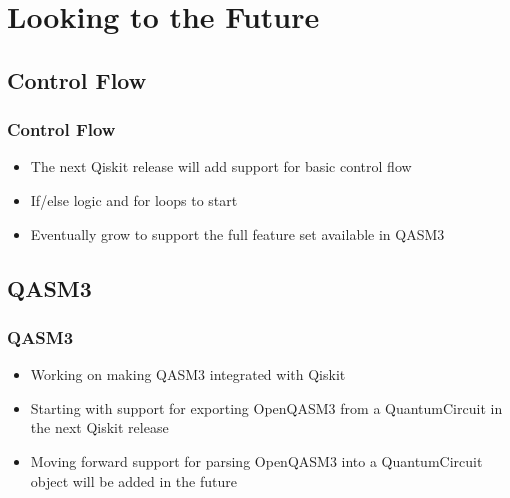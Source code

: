 \documentclass[aspectratio=169,11pt,hyperref={colorlinks=true}]{beamer}
\begin{document}
\section{Looking to the Future}
\subsection{Control Flow}
\begin{frame}
    \frametitle{Control Flow}
    \begin{itemize}
        \item The next Qiskit release will add support for basic control flow
        \item If/else logic and for loops to start
        \item Eventually grow to support the full feature set available in QASM3
    \end{itemize}
\end{frame}

\subsection{QASM3}
\begin{frame}
    \frametitle{QASM3}
    \begin{itemize}
        \item Working on making QASM3 integrated with Qiskit
        \item Starting with support for exporting OpenQASM3 from a QuantumCircuit in the next Qiskit release
        \item Moving forward support for parsing OpenQASM3 into a QuantumCircuit
            object will be added in the future
    \end{itemize} 
\end{frame}
\end{document}
